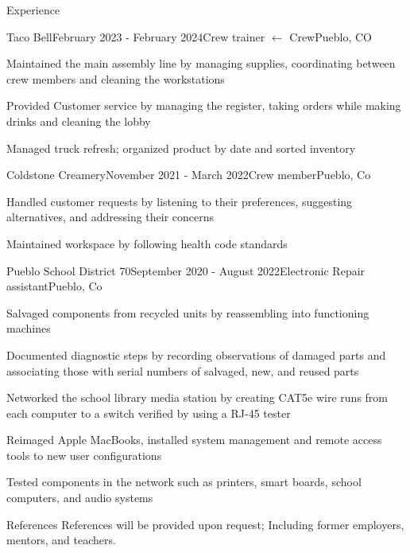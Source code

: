\documentclass{resume} %
\begin{document}
\begin{rSection}{Experience}

\begin{rSubsection}{Taco Bell}{February 2023 - February 2024}{Crew trainer $\leftarrow$ Crew}{Pueblo, CO}
\item Maintained the main assembly line by managing supplies, coordinating between crew members and cleaning the workstations
\item Provided Customer service by managing the register, taking orders while making drinks and cleaning the lobby
\item Managed truck refresh; organized product by date and sorted inventory 
\end{rSubsection}

\begin{rSubsection}{Coldstone Creamery}{November 2021 - March 2022}{Crew member}{Pueblo, Co}
\item Handled customer requests by listening to their preferences, suggesting alternatives, and addressing their concerns
\item Maintained workspace by following health code standards
\end{rSubsection}

\begin{rSubsection}{Pueblo School District 70}{September 2020 - August 2022}{Electronic Repair assistant}{Pueblo, Co}
\item Salvaged components from recycled units by reassembling into functioning machines
\item Documented diagnostic steps by recording observations of damaged parts and associating those with serial numbers of salvaged, new, and reused parts 
\item Networked the school library media station by creating CAT5e wire runs from each computer to a switch verified by using a RJ-45 tester
\item Reimaged Apple MacBooks, installed system management and remote access tools to new user configurations
\item Tested components in the network such as printers, smart boards, school computers, and audio systems 

\end{rSubsection}
\end{rSection}

\begin{rSection}{References}
References will be provided upon request; Including former employers, mentors, and teachers.
\end{rSection}
\end{document}
